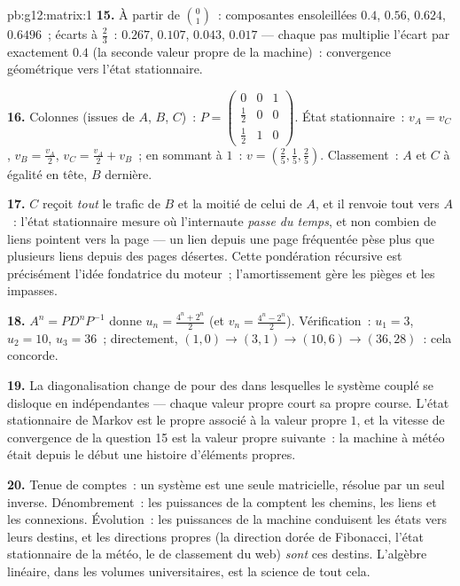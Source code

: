 \begin{solution}{pb:g12:matrix:1}
\textbf{15.} À partir de $\binom01$~: composantes ensoleillées
$0.4$, $0.56$, $0.624$, $0.6496$~; écarts à $\frac23$~: $0.267$,
$0.107$, $0.043$, $0.017$ --- chaque pas multiplie l'écart par
exactement $0.4$ (la seconde valeur propre de la machine)~:
convergence géométrique vers l'état stationnaire.

\textbf{16.} Colonnes (issues de $A$, $B$, $C$)~:
$P = \begin{pmatrix} 0 & 0 & 1\\ \frac12 & 0 & 0\\
\frac12 & 1 & 0\end{pmatrix}$. État stationnaire~: $v_A = v_C$,
$v_B = \frac{v_A}{2}$, $v_C = \frac{v_A}{2} + v_B$~; en sommant à
$1$~: $v = \left(\frac25, \frac15, \frac25\right)$. Classement~:
$A$ et $C$ à égalité en tête, $B$ dernière.

\textbf{17.} $C$ reçoit \emph{tout} le trafic de $B$ et la moitié
de celui de $A$, et il renvoie tout vers $A$~: l'état stationnaire
mesure où l'internaute \emph{passe du temps}, et non combien de
liens pointent vers la page --- un lien depuis une page fréquentée
pèse plus que plusieurs liens depuis des pages désertes. Cette
pondération récursive est précisément l'idée fondatrice du moteur~;
l'amortissement gère les pièges et les impasses.

\textbf{18.} $A^n = P D^n P^{-1}$ donne
$u_n = \frac{4^n + 2^n}{2}$ (et $v_n = \frac{4^n - 2^n}{2}$).
Vérification~: $u_1 = 3$, $u_2 = 10$, $u_3 = 36$~; directement,
$(1,0) \to (3,1) \to (10,6) \to (36, 28)$~: cela concorde.

\textbf{19.} La diagonalisation change de  pour des
 dans lesquelles le système couplé se disloque en  indépendantes --- chaque valeur propre court sa propre
course. L'état stationnaire de Markov est le  propre associé
à la valeur propre $1$, et la vitesse de convergence de la question
15 est la valeur propre suivante~: la machine à météo était depuis
le début une histoire d'éléments propres.

\textbf{20.} Tenue de comptes~: un système est une seule 
matricielle, résolue par un seul inverse. Dénombrement~: les
puissances de la  comptent les chemins, les liens
et les connexions. Évolution~: les puissances de la machine
conduisent les états vers leurs destins, et les directions propres
(la direction dorée de Fibonacci, l'état stationnaire de la météo,
le  de classement du web) \emph{sont} ces destins. L'algèbre
linéaire, dans les volumes universitaires, est la science de tout
cela.
\end{solution}
